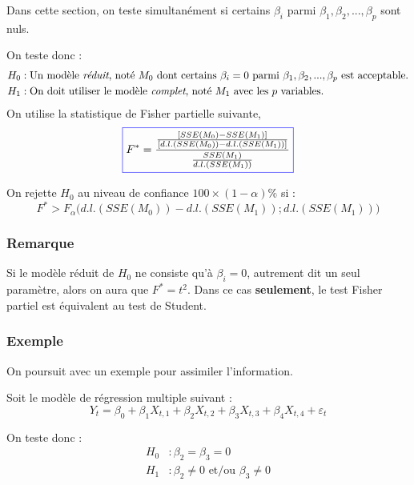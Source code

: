 \documentclass[11pt,french]{report}
\begin{document}
Dans cette section, on teste simultanément si certains $\beta_i$ parmi $\beta_1, \beta_2,...,\beta_p$ sont nuls.

On teste donc :
\begin{align*}
H_0 &: \text{Un modèle \emph{réduit}, noté $M_0$ dont certains $\beta_i =0$ parmi $\beta_1, \beta_2,...,\beta_p$ est acceptable.} \\
H_1 &: \text{On doit utiliser le modèle \emph{complet}, noté $M_1$ avec les $p$ variables.} \\
\end{align*}
On utilise la statistique de Fisher partielle suivante,
\begin{equation}
\label{eq:fisherpartiel}
\color{blue}
\boxed{\color{black}
F^* = \frac{\frac{[SSE(M_0) - SSE(M_1)]}{[d.l.(SSE(M_0)) - d.l.(SSE(M_1))]}}{\frac{SSE(M_1)}{d.l.(SSE(M_1))}}
}
\end{equation}

On rejette $H_0$ au niveau de confiance $100 \times (1 - \alpha)\%$ si :
$$
F^* > F_{\alpha}\Big( d.l.(SSE(M_0)) - d.l.(SSE(M_1)); d.l.(SSE(M_1)) \Big)
$$

\subsubsection*{Remarque}
Si le modèle réduit de $H_0$ ne consiste qu'à $\beta_i =0$, autrement dit un seul paramètre, alors on aura que $F^* = t^2$. Dans ce cas \textbf{seulement}, le test Fisher partiel est équivalent au test de Student.

\subsubsection*{Exemple}
On poursuit avec un exemple pour assimiler l'information. \newline

Soit le modèle de régression multiple suivant :
$$
Y_t = \beta_0 + \beta_1X_{t,1} + \beta_2X_{t,2} + \beta_3X_{t,3} + \beta_4X_{t,4} + \varepsilon_t
$$

On teste donc :
\begin{align*}
H_0 &: \beta_2 = \beta_3 = 0 \\
H_1 &: \beta_2 \neq 0 \text{ et/ou } \beta_3 \neq 0 \\
\end{align*}
\end{document}
